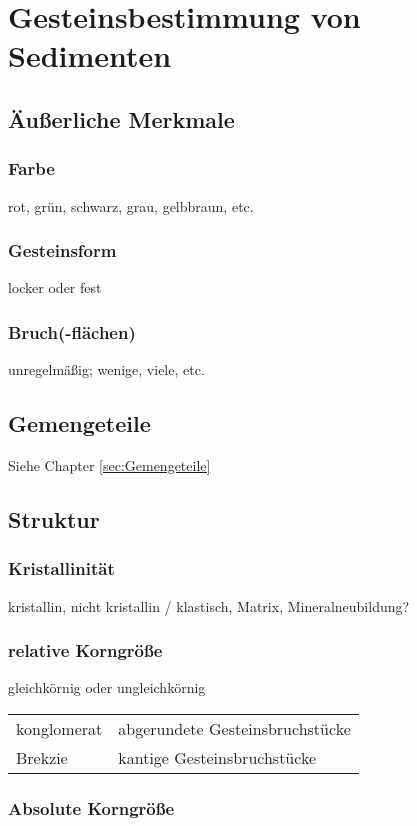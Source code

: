 \documentclass[a4, 12pt]{scrreprt}
\begin{document}
\part{Gesteinsbestimmung von Sedimenten}

\chapter{Äußerliche Merkmale}

\section{Farbe}
rot, grün, schwarz, grau, gelbbraun, etc.

\section{Gesteinsform}
locker oder fest

\section{Bruch(-flächen)}
unregelmäßig; wenige, viele, etc.

\chapter{Gemengeteile}
Siehe Chapter \ref{sec:Gemengeteile}

\chapter{Struktur}

\section{Kristallinität}
kristallin, nicht kristallin / klastisch, Matrix, Mineralneubildung?

\section{relative Korngröße}

gleichkörnig oder ungleichkörnig
\begin{tabular}{ll}
konglomerat & abgerundete Gesteinsbruchstücke\\
Brekzie & kantige Gesteinsbruchstücke\\
\end{tabular}

\section{Absolute Korngröße}
\end{document}
